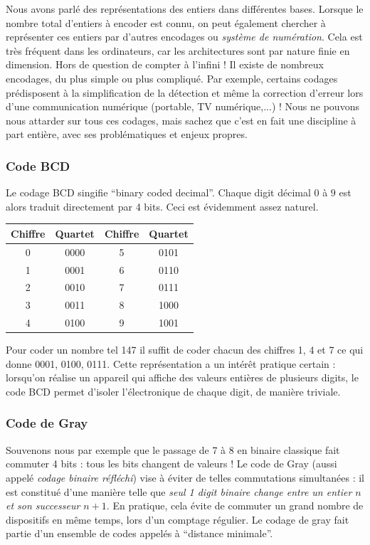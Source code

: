 Nous avons parlé des représentations des entiers dans différentes bases. Lorsque le nombre total d'entiers à encoder est connu, on peut également chercher à représenter ces entiers par d'autres encodages ou {\it système de numération}. Cela est très fréquent dans les ordinateurs, car les architectures sont par nature finie en dimension. Hors de question de compter à l'infini ! Il existe de nombreux encodages, du plus simple ou plus compliqué. Par exemple, certains codages prédisposent à la simplification de la détection et même la correction d'erreur lors d'une communication numérique (portable, TV numérique,...) ! Nous ne pouvons nous attarder sur tous ces codages, mais sachez que c'est en fait une discipline à part entière, avec ses problématiques et enjeux propres.

\subsubsection{Code BCD}
Le codage BCD singifie ``binary coded decimal''. Chaque digit décimal $0$ à $9$ est alors traduit directement par 4 bits. Ceci est évidemment assez naturel.
\begin{center}
\begin{tabular}{|cc|cc|}
\hline
Chiffre & Quartet & Chiffre & Quartet \\
\hline
0   & 0000 &       5  &  0101 \\
1   & 0001 &       6  &  0110 \\
2   & 0010 &       7  &  0111 \\
3   & 0011 &       8  &  1000 \\
4   & 0100 &       9  &  1001 \\
\hline
\end{tabular}
\end{center}

Pour coder un nombre tel 147 il suffit de coder chacun des chiffres 1, 4 et 7 ce qui donne 0001, 0100, 0111. Cette représentation a un intérêt pratique certain : lorsqu'on réalise un appareil qui affiche des valeurs entières de plusieurs digits, le code BCD permet d'isoler l'électronique de chaque digit, de manière triviale.

\subsubsection{Code de Gray}
Souvenons nous par exemple que le passage de 7 à 8 en binaire classique fait commuter 4 bits : tous les bits changent de valeurs ! Le code de Gray (aussi appelé {\it codage binaire réfléchi}) vise à éviter de telles commutations simultanées : il est constitué d'une manière telle que {\it seul 1 digit binaire change entre un entier $n$ et son successeur $n+1$}. En pratique, cela évite de commuter un grand nombre de dispositifs en même temps, lors d'un comptage régulier. Le codage de gray fait partie d'un ensemble de codes appelés à ``distance minimale''.

